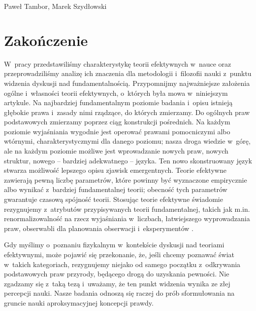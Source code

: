 \begin{artplenv2auth}{Paweł Tambor, Marek Szydłowski}
\section{Zakończenie}
W~pracy przedstawiliśmy charakterystykę teorii efektywnych w~nauce oraz przeprowadziliśmy analizę ich znaczenia dla metodologii i~filozofii nauki z~punktu widzenia dyskusji nad fundamentalnością. Przypomnijmy najważniejsze założenia ogólne i~własności teorii efektywnych, o~których była mowa w~niniejszym artykule. Na najbardziej fundamentalnym poziomie badania i~opisu istnieją głębokie prawa i~zasady nimi rządzące, do których zmierzamy. Do ogólnych praw podstawowych zmierzamy poprzez ciąg konstrukcji pośrednich. Na każdym poziomie wyjaśniania wygodnie jest operować prawami pomocniczymi albo wtórnymi, charakterystycznymi dla danego poziomu; nasza droga wiedzie w~górę, ale na każdym poziomie możliwe jest wprowadzanie nowych praw, nowych struktur, nowego -- bardziej adekwatnego -- języka. Ten nowo skonstruowany język stwarza możliwość lepszego opisu zjawisk emergentnych. Teorie efektywne zawierają pewną liczbę parametrów, które powinny być wyznaczone empirycznie albo wynikać z~bardziej fundamentalnej teorii; obecność tych parametrów gwarantuje czasową spójność teorii. Stosując teorie efektywne świadomie rezygnujemy z~atrybutów przypisywanych teorii fundamentalnej, takich jak m.in. renormalizowalność na rzecz wyjaśniania w~liczbach, łatwiejszego wyprowadzania praw, obserwabli dla planowania obserwacji i~eksperymentów
\parencite[][]{butterfield_renormalization_2015}.%


Gdy myślimy o~poznaniu fizykalnym w~kontekście dyskusji nad teoriami efektywnymi, może pojawić się przekonanie, że, jeśli chcemy poznawać świat w~takich kategoriach, rezygnujemy niejako od samego początku z~odkrywania podstawowych praw przyrody, będącego drogą do uzyskania pewności. Nie zgadzamy się z~taką tezą i~uważamy, że ten punkt widzenia wynika ze złej percepcji nauki. Nasze badania odnoszą się raczej do prób sformułowania na gruncie nauki aproksymacyjnej koncepcji prawdy.


\end{artplenv2auth}

